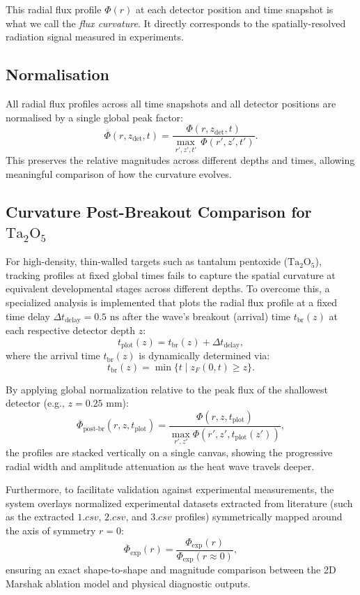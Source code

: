 \documentclass{article}
\begin{document}
This radial flux profile $\Phi(r)$ at each detector position and time snapshot is what we call the \emph{flux curvature}. It directly corresponds to the spatially-resolved radiation signal measured in experiments.

\subsection{Normalisation}
All radial flux profiles across all time snapshots and all detector positions are normalised by a single global peak factor:
\begin{equation}
\overline{\Phi}(r, z_{\text{det}}, t) = \frac{\Phi(r, z_{\text{det}}, t)}{\max_{r', z', t'} \, \Phi(r', z', t')}.
\end{equation}
This preserves the relative magnitudes across different depths and times, allowing meaningful comparison of how the curvature evolves.

\subsection{Curvature Post-Breakout Comparison for $\text{Ta}_2\text{O}_5$}
For high-density, thin-walled targets such as tantalum pentoxide ($\text{Ta}_2\text{O}_5$), tracking profiles at fixed global times fails to capture the spatial curvature at equivalent developmental stages across different depths. To overcome this, a specialized analysis is implemented that plots the radial flux profile at a fixed time delay $\Delta t_{\text{delay}} = 0.5\text{ ns}$ after the wave's breakout (arrival) time $t_{\text{br}}(z)$ at each respective detector depth $z$:
\begin{equation}
t_{\text{plot}}(z) = t_{\text{br}}(z) + \Delta t_{\text{delay}},
\end{equation}
where the arrival time $t_{\text{br}}(z)$ is dynamically determined via:
\begin{equation}
t_{\text{br}}(z) = \min \{ t \mid z_F(0, t) \ge z \}.
\end{equation}

By applying global normalization relative to the peak flux of the shallowest detector (e.g., $z = 0.25\text{ mm}$):
\begin{equation}
\overline{\Phi}_{\text{post-br}}(r, z, t_{\text{plot}}) = \frac{\Phi(r, z, t_{\text{plot}})}{\max_{r', z'} \Phi(r', z', t_{\text{plot}}(z'))},
\end{equation}
the profiles are stacked vertically on a single canvas, showing the progressive radial width and amplitude attenuation as the heat wave travels deeper. 

Furthermore, to facilitate validation against experimental measurements, the system overlays normalized experimental datasets extracted from literature (such as the extracted $1.csv$, $2.csv$, and $3.csv$ profiles) symmetrically mapped around the axis of symmetry $r = 0$:
\begin{equation}
\overline{\Phi}_{\text{exp}}(r) = \frac{\Phi_{\text{exp}}(r)}{\Phi_{\text{exp}}(r \approx 0)},
\end{equation}
ensuring an exact shape-to-shape and magnitude comparison between the 2D Marshak ablation model and physical diagnostic outputs.
\end{document}
